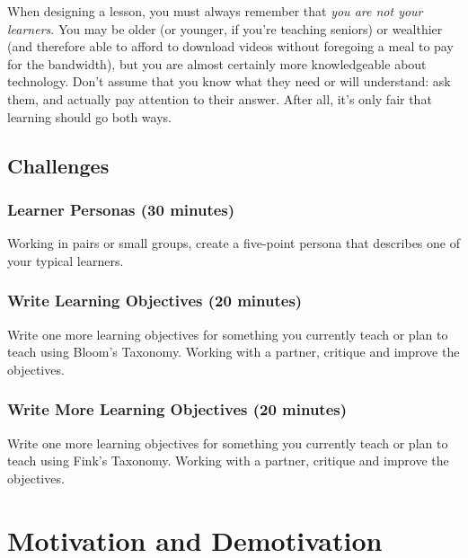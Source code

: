 \documentclass[10pt,statementpaper]{memoir}
\begin{document}
When designing a lesson, you must always remember that \emph{you are not
your learners}. You may be older (or younger, if you're teaching
seniors) or wealthier (and therefore able to afford to download videos
without foregoing a meal to pay for the bandwidth), but you are almost
certainly more knowledgeable about technology. Don't assume that you
know what they need or will understand: ask them, and actually pay
attention to their answer. After all, it's only fair that learning
should go both ways.

\section{Challenges}\label{challenges-5}

\subsection{Learner Personas (30
minutes)}\label{learner-personas-30-minutes}

Working in pairs or small groups, create a five-point persona that
describes one of your typical learners.

\subsection{Write Learning Objectives (20
minutes)}\label{write-learning-objectives-20-minutes}

Write one more learning objectives for something you currently teach or
plan to teach using Bloom's Taxonomy. Working with a partner, critique
and improve the objectives.

\subsection{Write More Learning Objectives (20
minutes)}\label{write-more-learning-objectives-20-minutes}

Write one more learning objectives for something you currently teach or
plan to teach using Fink's Taxonomy. Working with a partner, critique
and improve the objectives.

\chapter{Motivation and Demotivation}\label{motivation-and-demotivation}
\end{document}

